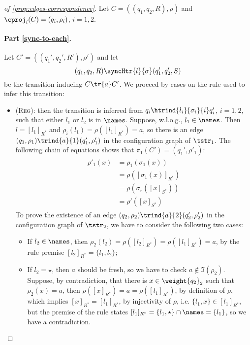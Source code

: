 \begin{proof}[of \cref{prop:edges-correspondence}]
Let $C = ((q_1,q_2,R),\rho)$ and $\cproj_i(C) = (q_i,\rho_i)$, $i=1,2$.

\paragraph{Part \eqref{sync-to-each}.}
 
Let $C' = ((q_1',q_2',R'),\rho')$ and let 
\[
	(q_1,q_2,R) \syncHtr{l}{\sigma} (q_1',q_2',S)
\] 
be the transition inducing $C \tr{a} C'$. We proceed by cases on the rule used to infer this transition:
\begin{itemize}
	\item (\textsc{Reg}): then the transition is inferred from $q_i \htrind{l_i}{\sigma_i}{i} q_i'$, $i=1,2$, such that either $l_1$ or $l_2$ is in $\names$. Suppose, w.l.o.g., $l_1 \in \names$. Then $l = [l_1]_{R^*}$ and $\rho_i(l_1) = \rho([l_1]_{R^*}) = a$, so there is an edge $(q_1,\rho_1) \trind{a}{1} (q_1',\rho_1')$ in the configuration graph of $\tstr_1$. The following chain of equations shows that $\pi_1(C') = (q_1',\rho'_1)$:\begin{equation}
		\label{eq:rho}
		\begin{gathered}
			\begin{array}{rl}
				\rho'_1(x) &= \rho_1 (\sigma_1 (x) ) \\
				&= \rho([\sigma_1(x)]_{R^*}) \\
&= \rho(\sigma_r([x]_{S^*})) \\
&= \rho'([x]_{S^*}) 
\end{array}
		\end{gathered}
		\tag{$\dagger$}
	\end{equation}
	To prove the existence of an edge $(q_2,\rho_2) \trind{a}{2} (q_2',\rho_2')$ in the configuration graph of $\tstr_2$, we have to consider the following two cases:
	\begin{itemize}
		\item If $l_2 \in \names$, then $\rho_2(l_2) = \rho([l_2]_{R^*}) = \rho([l_1]_{R^*}) = a$, by the rule premise $[l_2]_{R^*} = \{l_1,l_2\}$;
\item If $l_2 = \star$, then $a$ should be fresh, so we have to check $a \notin \Im(\rho_2)$. Suppose, by contradiction, that there is $x \in \weight{q_2}_2$ such that $\rho_2(x) = a$, then $\rho([x]_{R^*}) = a = \rho([l_1]_{R^*})$, by definition of $\rho$, which implies $[x]_{R^*} = [l_1]_{R^*}$, by injectivity of $\rho$, i.e. $\{l_1,x\} \in [l_1]_{R^*}$, but the premise of the rule states $[l_1]_{R^*} = \{l_1,\star\} \cap \names = \{l_1\}$, so we have a contradiction. 

\end{itemize}
\end{itemize}
\end{proof}
